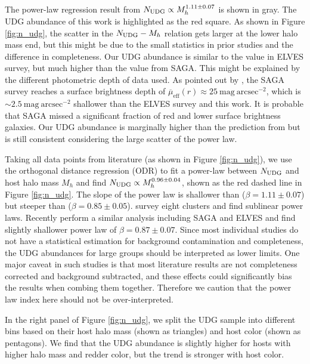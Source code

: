 \documentclass[twocolumn,astrosymb,twocolappendix]{aastex631}
\newcommand{\sbunit}{\mathrm{mag\ arcsec}^{-2}}
\newcommand{\sbeffr}{\overline{\mu}_{\mathrm{eff}}(r)}
\begin{document}
\begin{CJK*}{UTF8}{gbsn}
The power-law regression result from \citet{vdBurg2017} $N_{\rm UDG} \propto M_h^{1.11\pm 0.07}$ is shown in gray. The UDG abundance of this work is highlighted as the red square. As shown in Figure \ref{fig:n_udg}, the scatter in the $N_{\rm UDG}-M_h$ relation gets larger at the lower halo mass end, but this might be due to the small statistics in prior studies and the difference in completeness. Our UDG abundance is similar to the value in ELVES survey, but much higher than the value from SAGA. This might be explained by the different photometric depth of data used. As pointed out by \citet{CarlstenELVES2022,Font2022}, the SAGA survey reaches a surface brightness depth of $\sbeffr\approx 25\ \sbunit$, which is $\sim 2.5\ \sbunit$ shallower than the ELVES survey and this work. It is probable that SAGA missed a significant fraction of red and lower surface brightness galaxies. Our UDG abundance is marginally higher than the prediction from \citet{vdBurg2017} but is still consistent considering the large scatter of the power law. 

Taking all data points from literature (as shown in Figure \ref{fig:n_udg}), we use the orthogonal distance regression (ODR) to fit a power-law between $N_{\rm UDG}$ and host halo mass $M_h$ and find $N_{\rm UDG} \propto M_h^{0.96\pm 0.04}$, shown as the red dashed line in Figure \ref{fig:n_udg}. The slope of the power law is shallower than \citet{vdBurg2017} ($\beta=1.11\pm0.07$) but steeper than \citet{Roman2017b} ($\beta=0.85\pm0.05$). \citet{ManceraPina2018} survey eight clusters and find sublinear power laws. Recently \citet{Karunakaran2022b} perform a similar analysis including SAGA and ELVES and find slightly shallower power law of $\beta=0.87\pm0.07$. Since most individual studies do not have a statistical estimation for background contamination and completeness, the UDG abundances for large groups should be interpreted as lower limits. One major caveat in such studies is that most literature results are not completeness corrected and background subtracted, and these effects could significantly bias the results when combing them together. Therefore we caution that the power law index here should not be over-interpreted. 

In the right panel of Figure \ref{fig:n_udg}, we split the UDG sample into different bins based on their host halo mass (shown as triangles) and host color (shown as pentagons). We find that the UDG abundance is slightly higher for hosts with higher halo mass and redder color, but the trend is stronger with host color. 


\end{CJK*}
\end{document}

